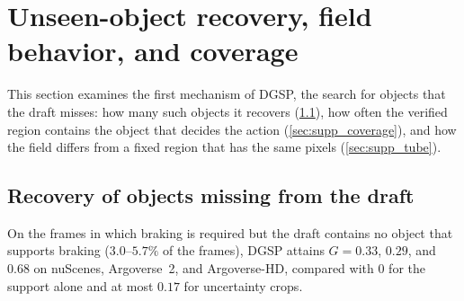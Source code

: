 \documentclass[10pt,letterpaper]{article}
\newcommand{\method}{DGSP\xspace}
\newcommand{\G}{G}
\theoremstyle{remark}
\theoremstyle{plain}
\theoremstyle{definition}
\begin{document}
\section{Unseen-object recovery, field behavior, and coverage}
\label{sec:supp_field}

This section examines the first mechanism of \method, the search for objects that the draft misses: how many such objects it recovers (\cref{sec:supp_missed}), how often the verified region contains the object that decides the action (\cref{sec:supp_coverage}), and how the field differs from a fixed region that has the same pixels (\cref{sec:supp_tube}).

\subsection{Recovery of objects missing from the draft}
\label{sec:supp_missed}

On the frames in which braking is required but the draft contains no object that supports braking ($3.0$--$5.7\%$ of the frames), \method attains $\G=0.33$, $0.29$, and $0.68$ on nuScenes, Argoverse~2, and Argoverse-HD, compared with $0$ for the support alone and at most $0.17$ for uncertainty crops.
\end{document}
